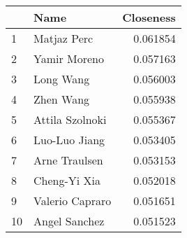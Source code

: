 \begin{tabular}{llr}
\toprule
{} &             Name &  Closeness \\
\midrule
1  &      Matjaz Perc &   0.061854 \\
2  &     Yamir Moreno &   0.057163 \\
3  &        Long Wang &   0.056003 \\
4  &        Zhen Wang &   0.055938 \\
5  &  Attila Szolnoki &   0.055367 \\
6  &    Luo-Luo Jiang &   0.053405 \\
7  &    Arne Traulsen &   0.053153 \\
8  &     Cheng-Yi Xia &   0.052018 \\
9  &  Valerio Capraro &   0.051651 \\
10 &    Angel Sanchez &   0.051523 \\
\bottomrule
\end{tabular}
